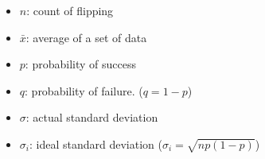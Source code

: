 \documentclass{article}
\providecommand{\tightlist}{%
      \setlength{\itemsep}{0pt}\setlength{\parskip}{0pt}}
\begin{document}
\begin{itemize}
\tightlist
\item
  \(n\): count of flipping
\item
  \(\bar{x}\): average of a set of data
\item
  \(p\): probability of success
\item
  \(q\): probability of failure. (\(q = 1 - p\))
\item
  \(\sigma\): actual standard deviation
\item
  \(\sigma_i\): ideal standard deviation (\(\sigma_i = \sqrt{np(1-p)}\))
\end{itemize}


    
    
    
    
\end{document}

